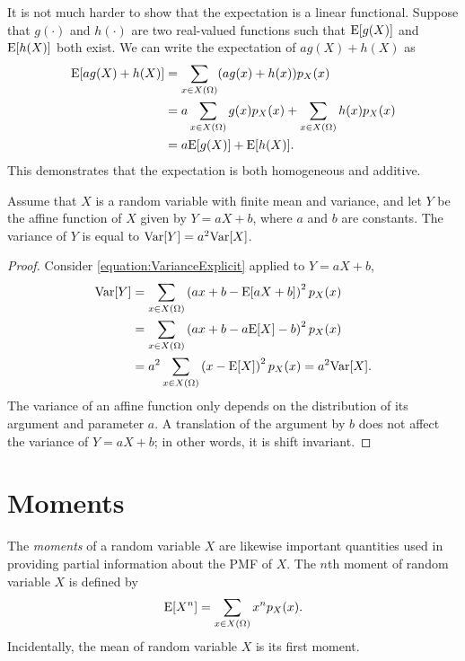 It is not much harder to show that the expectation is a linear functional.
Suppose that $g(\cdot)$ and $h(\cdot)$ are two real-valued functions such that $\mathrm{E} [g(X)]$ and $\mathrm{E} [h(X)]$ both exist.
We can write the expectation of $a g(X) + h(X)$ as
\begin{equation*}
\begin{split}
\mathrm{E} [ a g(X) + h(X) ] &= \sum_{x \in X(\Omega)} (a g(x) + h(x)) p_X(x) \\
&= a \sum_{x \in X(\Omega)} g(x) p_X(x) + \sum_{x \in X(\Omega)} h(x) p_X(x) \\
&= a \mathrm{E} [g(X)] + \mathrm{E} [h(X)] .
\end{split}
\end{equation*}
This demonstrates that the expectation is both homogeneous and additive.

\begin{proposition}
Assume that $X$ is a random variable with finite mean and variance, and let $Y$ be the affine function of $X$ given by $Y = aX + b$, where $a$ and $b$ are constants.
The variance of $Y$ is equal to $\mathrm{Var} [Y] = a^2 \mathrm{Var} [X]$.
\end{proposition}
\begin{proof}
Consider \eqref{equation:VarianceExplicit} applied to $Y = aX + b$,
\begin{equation*}
\begin{split}
\mathrm{Var} [Y]
&= \sum_{x \in X(\Omega)} \left( ax + b - \mathrm{E} [aX + b] \right)^2 p_X(x) \\
&= \sum_{x \in X(\Omega)} \left( ax + b - a \mathrm{E} [X] - b \right)^2 p_X(x) \\
&= a^2 \sum_{x \in X(\Omega)} \left( x - \mathrm{E} [X] \right)^2 p_X(x)
= a^2 \mathrm{Var} [X] .
\end{split}
\end{equation*}
The variance of an affine function only depends on the distribution of its argument and parameter $a$.
A translation of the argument by $b$ does not affect the variance of $Y = aX + b$;
in other words, it is shift invariant.
\end{proof}


\section{Moments}

The \emph{moments} of a random variable $X$ are likewise important quantities used in providing partial information about the PMF of $X$. 
The $n$th moment of random variable $X$ is defined by
\begin{equation} \label{equation:DiscreteMoments}
\mathrm{E} [X^n] = \sum_{x \in X(\Omega)} x^n p_X (x) .
\end{equation}
Incidentally, the mean of random variable $X$ is its first moment.


